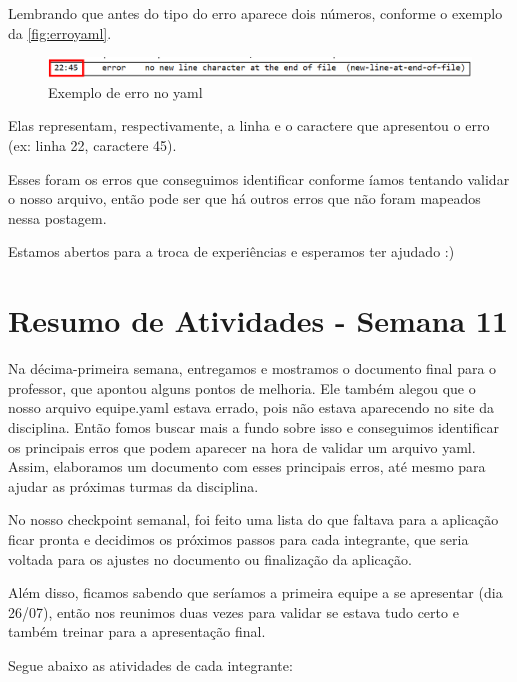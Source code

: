 \begin{apendicesenv}
Lembrando que antes do tipo do erro aparece dois números, conforme o exemplo da \autoref{fig:erroyaml}.

\begin{figure}[htb]
    \centering
	\includegraphics[width=16cm]{imagens/erro yaml.png}
	\caption{\label{fig:erroyaml} Exemplo de erro no yaml}
\end{figure}
\FloatBarrier

Elas representam, respectivamente, a linha e o caractere que apresentou o erro (ex: linha 22, caractere 45).


Esses foram os erros que conseguimos identificar conforme íamos tentando validar o nosso arquivo, então pode ser que há outros erros que não foram mapeados nessa postagem. 

Estamos abertos para a troca de experiências e esperamos ter ajudado :)

\section{Resumo de Atividades - Semana 11}
Na décima-primeira semana, entregamos e mostramos o documento final para o professor, que apontou alguns pontos de melhoria. Ele também alegou que o nosso arquivo equipe.yaml estava errado, pois não estava aparecendo no site da disciplina. Então fomos buscar mais a fundo sobre isso e conseguimos identificar os principais erros que podem aparecer na hora de validar um arquivo yaml. Assim, elaboramos um documento com esses principais erros, até mesmo para ajudar as próximas turmas da disciplina. 

No nosso checkpoint semanal, foi feito uma lista do que faltava para a aplicação ficar pronta e decidimos os próximos passos para cada integrante, que seria voltada para os ajustes no documento ou finalização da aplicação.

Além disso, ficamos sabendo que seríamos a primeira equipe a se apresentar (dia 26/07), então nos reunimos duas vezes para validar se estava tudo certo e também treinar para a apresentação final. 

Segue abaixo as atividades de cada integrante:


\end{apendicesenv}
